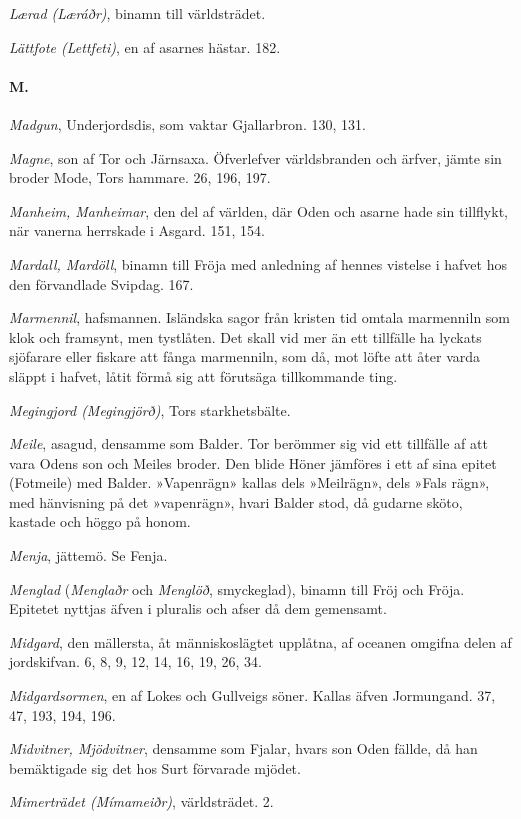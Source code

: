\emph{Lærad (Læráðr)}, binamn till världsträdet.

\emph{Lättfote (Lettfeti)}, en af asarnes hästar. 182.

\paragraph{M.}

\emph{Madgun}, Underjordsdis, som vaktar Gjallarbron. 130, 131.

\emph{Magne}, son af Tor och Järnsaxa. Öfverlefver världsbranden och
ärfver, jämte sin broder Mode, Tors hammare. 26, 196, 197.

\emph{Manheim, Manheimar}, den del af världen, där Oden och asarne hade
sin tillflykt, när vanerna herrskade i Asgard. 151, 154.

\emph{Mardall, Mardöll}, binamn till Fröja med anledning af hennes
vistelse i hafvet hos den förvandlade Svipdag. 167.

\emph{Marmennil}, hafsmannen. Isländska sagor från kristen tid omtala
marmenniln som klok och framsynt, men tystlåten. Det skall vid mer än
ett tillfälle ha lyckats sjöfarare eller fiskare att fånga marmenniln,
som då, mot löfte att åter varda släppt i hafvet, låtit förmå sig att
förutsäga tillkommande ting.

\emph{Megingjord (Megingjörð)}, Tors starkhetsbälte.

\emph{Meile}, asagud, densamme som Balder. Tor berömmer sig vid ett
tillfälle af att vara Odens son och Meiles broder. Den blide Höner
jämföres i ett af sina epitet (Fotmeile) med Balder. »Vapenrägn» kallas
dels »Meilrägn», dels »Fals rägn», med hänvisning på det »vapenrägn»,
hvari Balder stod, då gudarne sköto, kastade och höggo på honom.

\emph{Menja}, jättemö. Se Fenja.

\emph{Menglad} (\emph{Menglaðr} och \emph{Menglöð}, smyckeglad), binamn
till Fröj och Fröja. Epitetet nyttjas äfven i pluralis och afser då dem
gemensamt.

\emph{Midgard}, den mällersta, åt människoslägtet upplåtna, af oceanen
omgifna delen af jordskifvan. 6, 8, 9, 12, 14, 16, 19, 26, 34.

\emph{Midgardsormen}, en af Lokes och Gullveigs söner. Kallas äfven
Jormungand. 37, 47, 193, 194, 196.

\emph{Midvitner, Mjödvitner}, densamme som Fjalar, hvars son Oden
fällde, då han bemäktigade sig det hos Surt förvarade mjödet.

\emph{Mimerträdet (Mímameiðr)}, världsträdet. 2.


